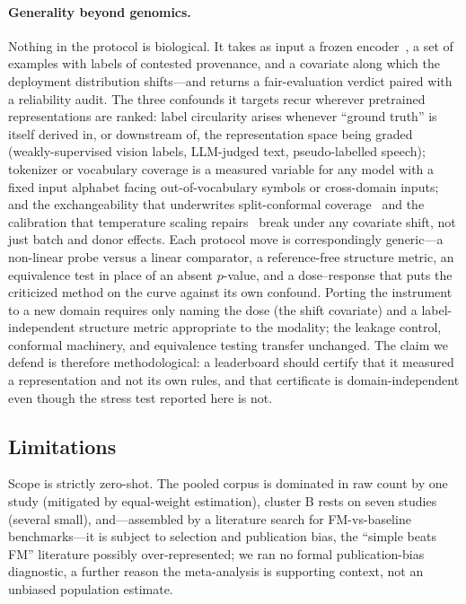 \documentclass[fleqn,10pt,lineno]{wlpeerj}  %
\begin{document}
\paragraph{Generality beyond genomics.} Nothing in the protocol is biological. It takes as input a frozen encoder~\cite{bommasani2021,vaswani2017}, a set of examples with labels of contested provenance, and a covariate along which the deployment distribution shifts---and returns a fair-evaluation verdict paired with a reliability audit. The three confounds it targets recur wherever pretrained representations are ranked: label circularity arises whenever ``ground truth'' is itself derived in, or downstream of, the representation space being graded (weakly-supervised vision labels, LLM-judged text, pseudo-labelled speech); tokenizer or vocabulary coverage is a measured variable for any model with a fixed input alphabet facing out-of-vocabulary symbols or cross-domain inputs; and the exchangeability that underwrites split-conformal coverage~\cite{vovk2005,angelopoulos2023,barber2023} and the calibration that temperature scaling repairs~\cite{guo2017} break under any covariate shift, not just batch and donor effects. Each protocol move is correspondingly generic---a non-linear probe versus a linear comparator, a reference-free structure metric, an equivalence test in place of an absent $p$-value, and a dose--response that puts the criticized method on the curve against its own confound. Porting the instrument to a new domain requires only naming the dose (the shift covariate) and a label-independent structure metric appropriate to the modality; the leakage control, conformal machinery, and equivalence testing transfer unchanged. The claim we defend is therefore methodological: a leaderboard should certify that it measured a representation and not its own rules, and that certificate is domain-independent even though the stress test reported here is not.

\subsection*{Limitations}
Scope is strictly zero-shot. The pooled corpus is dominated in raw count by one study (mitigated by equal-weight estimation), cluster B rests on seven studies (several small), and---assembled by a literature search for FM-vs-baseline benchmarks---it is subject to selection and publication bias, the ``simple beats FM'' literature possibly over-represented; we ran no formal publication-bias diagnostic, a further reason the meta-analysis is supporting context, not an unbiased population estimate.
\end{document}
